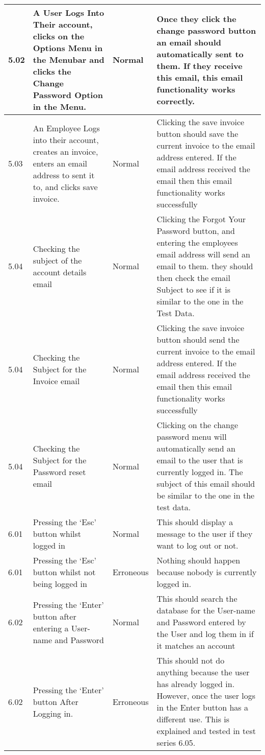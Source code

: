 \begin{flushleft}
\begin{longtable}{|p{1.5cm}|p{2.5cm}|p{2cm}|p{4.5cm}|}
	\rowcolor{light-grey}5.02 & A User Logs Into Their account, clicks on the Options Menu in the Menubar and clicks the Change Password Option in the Menu.& Normal & Once they click the change password button an email should automatically sent to them. If they receive this email, this email functionality works correctly. \\ \hline
	\rowcolor{light-grey}5.03 & An Employee Logs into their account, creates an invoice, enters an email address to sent it to, and clicks save invoice. & Normal & Clicking the save invoice button should save the current invoice to the email address entered. If the email address received the email then this email functionality works successfully\\ \hline
	\rowcolor{light-grey}5.04 & Checking the subject of the account details email &Normal & Clicking the Forgot Your Password button, and entering the employees email address will send an email to them. they should then check the email Subject to see if it is similar to the one in the Test Data.\\ \hline
	\rowcolor{light-grey}5.04 & Checking the Subject for the Invoice email  & Normal & Clicking the save invoice button should send the current invoice to the email address entered. If the email address received the email then this email functionality works successfully\\ \hline
	\rowcolor{light-grey}5.04 &Checking the Subject for the Password reset email & Normal & Clicking on the change password menu will automatically send an email to the user that is currently logged in. The subject of this email should be similar to the one in the test data.\\ \hline
	\rowcolor{light-grey}6.01 & Pressing the `Esc' button whilst logged in & Normal & This should display a message to the user if they want to log out or not.\\ \hline
	\rowcolor{light-grey}6.01 & Pressing the `Esc' button whilst not being logged in & Erroneous & Nothing should happen because nobody is currently logged in.\\ \hline
	\rowcolor{light-grey}6.02 & Pressing the `Enter' button after entering a User-name and Password & Normal & This should search the database for the User-name and Password entered by the User and log them in if it matches an account\\ \hline
	\rowcolor{light-grey}6.02 & Pressing the `Enter' button After Logging in. & Erroneous & This should not do anything because the user has already logged in. However, once the user logs in the Enter button has a different use. This is explained and tested in test series 6.05.\\ \hline

\end{longtable}
\end{flushleft}
